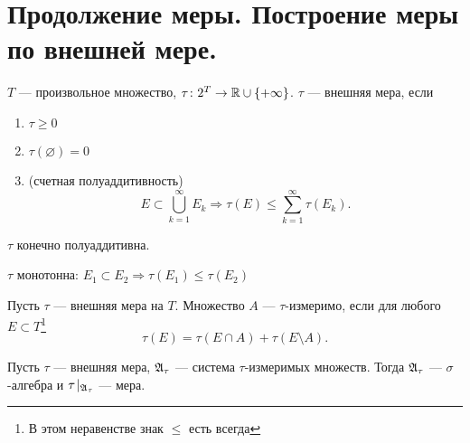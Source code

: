 \section{Продолжение меры. Построение меры по внешней мере.}
\begin{defn}
    $ T$ --- произвольное множество, $ \tau \colon 2^{T} \to \mathbb{R} \cup \{+\infty\}$. $ \tau $ --- {\sf внешняя мера}, если  
\begin{enumerate}[label=(\roman*),noitemsep]
    \item  $\tau \ge 0$
	\item $ \tau (\varnothing) = 0$
	\item (счетная полуаддитивность) \[
			E \subset \bigcup_{k=1}^{\infty} E_k \Longrightarrow \tau (E) \le \sum_{k=1}^{\infty} \tau (E_k)
	.\] 
\end{enumerate} 
\begin{note}
    $ \tau $ конечно полуаддитивна.
\end{note}
\begin{note}
	$ \tau $ монотонна: $ E_1 \subset E_2 \Longrightarrow \tau (E_1) \le \tau (E_2) $
\end{note}
\end{defn}
\begin{defn}
	Пусть $ \tau $ --- внешняя мера на $ T$. Множество $ A$ --- {\sf $ \tau $-измеримо}, если для любого $ E \subset T$\footnote{В этом неравенстве знак $ \le $ есть всегда}
	\begin{equation}\label{eq:meas}
		\tau (E) = \tau (E \cap A) + \tau (E \setminus A).
	\end{equation}
\end{defn}
\begin{thm}
    Пусть $ \tau $ --- внешняя мера, $ \mathfrak{A}_{\tau }$ --- система $ \tau $-измеримых множеств. Тогда $ \mathfrak{A}_{\tau }$ --- $ \sigma $-алгебра и $ \tau \! \mid_{\mathfrak{A}_{\tau }}$ --- мера.
\end{thm}
